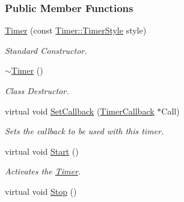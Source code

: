 \subsubsection*{Public Member Functions}
\begin{DoxyCompactItemize}
\item 
\hyperlink{classphys_1_1Timer_a25b70d2d45c5c56cce475841b7b18cd0}{Timer} (const \hyperlink{classphys_1_1Timer_a1ee86bf43e20329d750c5d582dcce329}{Timer::TimerStyle} style)
\begin{DoxyCompactList}\small\item\em Standard Constructor. \item\end{DoxyCompactList}\item 
\hypertarget{classphys_1_1Timer_ab96eede362c41f1ab56f1530cbae22b8}{
\hyperlink{classphys_1_1Timer_ab96eede362c41f1ab56f1530cbae22b8}{$\sim$Timer} ()}
\label{d3/d83/classphys_1_1Timer_ab96eede362c41f1ab56f1530cbae22b8}

\begin{DoxyCompactList}\small\item\em Class Destructor. \item\end{DoxyCompactList}\item 
virtual void \hyperlink{classphys_1_1Timer_a046ca4f7dcf2503e5993a18e11172f5e}{SetCallback} (\hyperlink{classphys_1_1TimerCallback}{TimerCallback} $\ast$Call)
\begin{DoxyCompactList}\small\item\em Sets the callback to be used with this timer. \item\end{DoxyCompactList}\item 
\hypertarget{classphys_1_1Timer_a2ec14a41cda7c31637351ab63f63304a}{
virtual void \hyperlink{classphys_1_1Timer_a2ec14a41cda7c31637351ab63f63304a}{Start} ()}
\label{d3/d83/classphys_1_1Timer_a2ec14a41cda7c31637351ab63f63304a}

\begin{DoxyCompactList}\small\item\em Activates the \hyperlink{classphys_1_1Timer}{Timer}. \item\end{DoxyCompactList}\item 
\hypertarget{classphys_1_1Timer_aa934478424678f84e8f4afb472eebbae}{
virtual void \hyperlink{classphys_1_1Timer_aa934478424678f84e8f4afb472eebbae}{Stop} ()}
\label{d3/d83/classphys_1_1Timer_aa934478424678f84e8f4afb472eebbae}


\end{DoxyCompactItemize}
